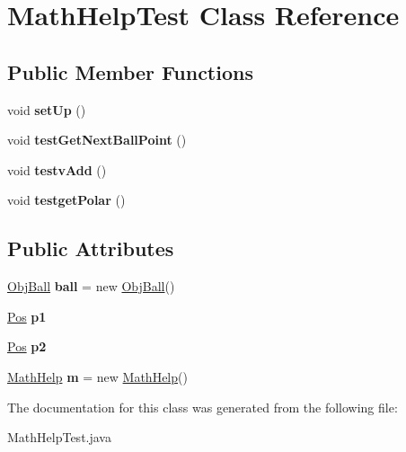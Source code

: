 \hypertarget{classMathHelpTest}{
\section{MathHelpTest Class Reference}
\label{classMathHelpTest}
}
\subsection*{Public Member Functions}
\begin{DoxyCompactItemize}
\item 
\hypertarget{classMathHelpTest_a5b8756fdab69e687ff9eefb7b5200e3b}{
void {\bfseries setUp} ()}
\label{classMathHelpTest_a5b8756fdab69e687ff9eefb7b5200e3b}

\item 
\hypertarget{classMathHelpTest_ae0f3b38e015ea7ddeb999b695dbb1399}{
void {\bfseries testGetNextBallPoint} ()}
\label{classMathHelpTest_ae0f3b38e015ea7ddeb999b695dbb1399}

\item 
\hypertarget{classMathHelpTest_af21b7dfc68c808406a15085652a9b9f7}{
void {\bfseries testvAdd} ()}
\label{classMathHelpTest_af21b7dfc68c808406a15085652a9b9f7}

\item 
\hypertarget{classMathHelpTest_a57ea3ad3bc28e5596d80921c7000e02c}{
void {\bfseries testgetPolar} ()}
\label{classMathHelpTest_a57ea3ad3bc28e5596d80921c7000e02c}

\end{DoxyCompactItemize}
\subsection*{Public Attributes}
\begin{DoxyCompactItemize}
\item 
\hypertarget{classMathHelpTest_ad49a066e6278e12b4f31b11a47d3cab7}{
\hyperlink{classObjBall}{ObjBall} {\bfseries ball} = new \hyperlink{classObjBall}{ObjBall}()}
\label{classMathHelpTest_ad49a066e6278e12b4f31b11a47d3cab7}

\item 
\hypertarget{classMathHelpTest_a5a608db52a871a2768d36c063a513069}{
\hyperlink{classPos}{Pos} {\bfseries p1}}
\label{classMathHelpTest_a5a608db52a871a2768d36c063a513069}

\item 
\hypertarget{classMathHelpTest_a7e625558467054b7f5e38898f9d5695c}{
\hyperlink{classPos}{Pos} {\bfseries p2}}
\label{classMathHelpTest_a7e625558467054b7f5e38898f9d5695c}

\item 
\hypertarget{classMathHelpTest_abe892e40d9d0013ff54b01da93d1cfc1}{
\hyperlink{classMathHelp}{MathHelp} {\bfseries m} = new \hyperlink{classMathHelp}{MathHelp}()}
\label{classMathHelpTest_abe892e40d9d0013ff54b01da93d1cfc1}

\end{DoxyCompactItemize}


The documentation for this class was generated from the following file:\begin{DoxyCompactItemize}
\item 
MathHelpTest.java\end{DoxyCompactItemize}
